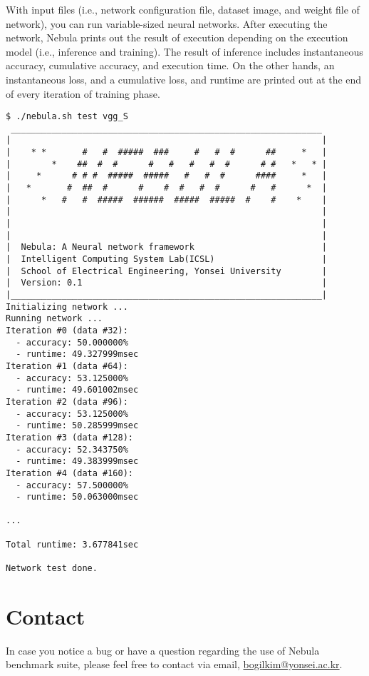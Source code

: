 \documentclass[10pt]{article}
\begin{document}
With input files (i.e., network configuration file, dataset image, and weight file of network), you can run variable-sized neural networks.
After executing the network, Nebula prints out the result of execution depending on the execution model (i.e., inference and training).
The result of inference includes instantaneous accuracy, cumulative accuracy, and execution time.
On the other hands, an instantaneous loss, and a cumulative loss, and runtime are printed out at the end of every iteration of training phase.
\begin{Verbatim}[frame=single,fontsize=\small]
$ ./nebula.sh test vgg_S
 _____________________________________________________________
|                                                             |
|    * *       #   #  #####  ###     #   #  #      ##     *   |
|        *    ##  #  #      #   #   #   #  #      # #   *   * |
|     *      # # #  #####  #####   #   #  #      ####     *   |
|   *       #  ##  #      #    #  #   #  #      #   #      *  |
|      *   #   #  #####  ######  #####  #####  #    #    *    |
|                                                             |
|                                                             |
|                                                             |
|  Nebula: A Neural network framework                         |
|  Intelligent Computing System Lab(ICSL)                     |
|  School of Electrical Engineering, Yonsei University        |
|  Version: 0.1                                               |
|_____________________________________________________________|
Initializing network ...
Running network ...
Iteration #0 (data #32):
  - accuracy: 50.000000%
  - runtime: 49.327999msec
Iteration #1 (data #64):
  - accuracy: 53.125000%
  - runtime: 49.601002msec
Iteration #2 (data #96):
  - accuracy: 53.125000%
  - runtime: 50.285999msec
Iteration #3 (data #128):
  - accuracy: 52.343750%
  - runtime: 49.383999msec
Iteration #4 (data #160):
  - accuracy: 57.500000%
  - runtime: 50.063000msec

...

Total runtime: 3.677841sec

Network test done.
\end{Verbatim}

\section{Contact} \label{sec:contact}
In case you notice a bug or have a question regarding the use of Nebula benchmark suite, please feel free to contact via email, \href{mailto:bogilkim@yonsei.ac.kr}{bogilkim@yonsei.ac.kr}.
\end{document}
